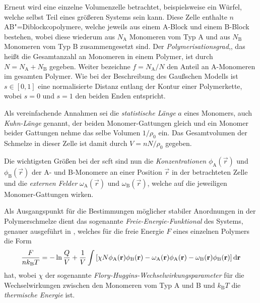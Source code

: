 \documentclass[../main.tex]{subfiles}
\begin{document}
Erneut wird eine einzelne Volumenzelle betrachtet, beispielsweise ein Würfel, welche selbst Teil eines größeren Systems sein kann.
Diese Zelle enthalte $n$ AB"=Diblockcopolymere, welche jeweils aus einem A-Block und einem B-Block bestehen, wobei diese wiederum aus $N_{\mathrm{A}}$ Monomeren vom Typ A und aus $N_{\mathrm{B}}$ Monomeren vom Typ B zusammengesetzt sind.
Der \emph{Polymerisationsgrad},, das heißt die Gesamtanzahl an Monomeren in einem Polymer, ist durch $N = N_{\mathrm{A}} + N_{\mathrm{B}}$ gegeben.
Weiter bezeichne $f = N_{\mathrm{A}} / N$ den Anteil an A-Monomeren im gesamten Polymer.
Wie bei der Beschreibung des Gaußschen Modells ist $s \in [0, 1]$ eine normalisierte Distanz entlang der Kontur einer Polymerkette, wobei $s = 0$ und $s = 1$ den beiden Enden entspricht.

Als vereinfachende Annahmen sei die \emph{statistische Länge} $a$ eines Monomers, auch \emph{Kuhn-Länge} genannt, der beiden Monomer-Gattungen gleich und ein Monomer beider Gattungen nehme das selbe Volumen $1 / \rho_{0}$ ein.
Das Gesamtvolumen der Schmelze in dieser Zelle ist damit durch $V = n N / \rho_{0}$ gegeben.

Die wichtigsten Größen bei der \ac{scft} sind nun die \emph{Konzentrationen} $\phi_{\mathrm{A}}(\vec{r})$ und $\phi_{\mathrm{B}}(\vec{r})$ der A- und B-Monomere an einer Position $\vec{r}$ in der betrachteten Zelle und die \emph{externen Felder} $\omega_{\mathrm{A}}(\vec{r})$ und $\omega_{\mathrm{B}}(\vec{r})$, welche auf die jeweiligen Monomer-Gattungen wirken.

Als Ausgangspunkt für die Bestimmungen möglicher stabiler Anordnungen in der Polymerschmelze dient das sogenannte \emph{Freie-Energie-Funktional} des Systems, genauer ausgeführt in \cite{Matsen:2006ud,Fredrickson:2006th}, welches für die freie Energie $F$ eines einzelnen Polymers die Form
\begin{equation}
\label{eq:freie_energie_funktional}
    \frac{F}{nk_{\mathrm{B}}T} = - \ln \frac{Q}{V} + \frac{1}{V} \int \left[ \chi N \phi_{\mathrm{A}}(\mathbf{r}) \phi_{\mathrm{B}}(\mathbf{r}) - \omega_{\mathrm{A}}(\mathbf{r}) \phi_{\mathrm{A}}(\mathbf{r}) - \omega_{\mathrm{B}}(\mathbf{r}) \phi_{\mathrm{B}}(\mathbf{r}) \right] \mathop{}\!\mathrm{d} \mathbf{r}
\end{equation}
hat, wobei $\chi$ der sogenannte \emph{Flory-Huggins-Wechselwirkungsparameter} für die Wechselwirkungen zwischen den Monomeren vom Typ A und B und $k_{\mathrm{B}} T$ die \emph{thermische Energie} ist.
\end{document}
